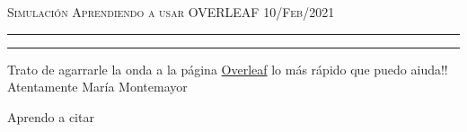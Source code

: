 \documentclass[12pt]{amsart}
\begin{document}
\thispagestyle{empty}

{\scshape Simulación} \hfill {\scshape \Large Aprendiendo a usar OVERLEAF} \hfill {\scshape 10/Feb/2021}
 
\medskip

\hrule
\hrule
\bigskip

\bigskip

Trato de agarrarle la onda a la página \href{https://www.overleaf.com/project}{Overleaf} lo más rápido que puedo aiuda!! Atentamente María Montemayor
\bigskip


Aprendo a citar \citep{ejemplo}




\bigskip
\end{document}
